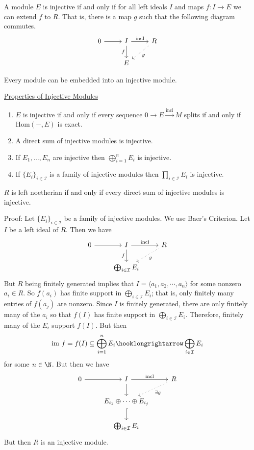 \begin{thm}
A module $E$ is injective if and only if for all left ideals $I$ and maps $f: I \rightarrow E$ we can extend $f$ to $R$. That is, there is a map $g$ such that the following diagram commutes.
\[
\begin{tikzcd}
0 \arrow{r} & I \arrow{r}{\text{incl}} \arrow[swap]{d}{f} & R \arrow[dotted]{dl}{g} \\
 & E & 
\end{tikzcd}
\]
\end{thm}

\begin{thm}
Every module can be embedded into an injective module.
\end{thm}


\noindent\underline{Properties of Injective Modules}
\begin{enumerate}[(1)]
\item $E$ is injective if and only if every sequence $0 \longrightarrow E \stackrel{\text{incl}}{\longrightarrow} M$ splits if and only if $\text{Hom}(-,E)$ is exact.
\item A direct sum of injective modules is injective. 
\item If $E_1,\ldots,E_n$ are injective then $\bigoplus_{i=1}^n E_i$ is injective.
\item If $\{E_i\}_{i \in \mathcal{I}}$ is a family of injective modules then $\prod_{i \in \mathcal{I}} E_i$ is injective.
\end{enumerate}

\begin{thm}
$R$ is left noetherian if and only if every direct sum of injective modules is injective. 
\end{thm}

Proof: Let $\{E_i\}_{i \in \mathcal{I}}$ be a family of injective modules. We use Baer's Criterion. Let $I$ be a left ideal of $R$. Then we have
\[
\begin{tikzcd}
0 \arrow{r} & I \arrow{r}{\text{incl}} \arrow[swap]{d}{f} & R \arrow[dotted]{dl}{g} \\
 & \bigoplus_{i \in \mathcal{I}} E_i & 
\end{tikzcd}
\]
But $R$ being finitely generated implies that $I=\langle a_1,a_2,\cdots,a_n \rangle$ for some nonzero $a_i \in R$. So $f(a_i)$ has finite support in $\bigoplus_{i \in \mathcal{I}} E_i$; that is, only finitely many entries of $f(a_j)$ are nonzero. Since $I$ is finitely generated, there are only finitely many of the $a_i$ so that $f(I)$ has finite support in $\bigoplus_{i \in \mathcal{I}} E_i$. Therefore, finitely many of the $E_i$ support $f(I)$. But then
\[
\text{im } f=f(I)\subseteq \bigoplus_{i=1}^n E_i  \hooklongrightarrow \bigoplus_{i \in \mathcal{I}} E_i
\]
for some $n \in \N$. But then we have
\[
\begin{tikzcd}
0 \arrow{r} & I \arrow{r}{\text{incl}} \arrow{d} & R \arrow[dotted]{dl}{\exists g} \\  
 & E_{i_1} \oplus \cdots \oplus E_{i_j} \arrow[hook]{d} & \\
  & \bigoplus_{i \in \mathcal{I}} E_i & 
\end{tikzcd}
\]
But then $R$ is an injective module. 


